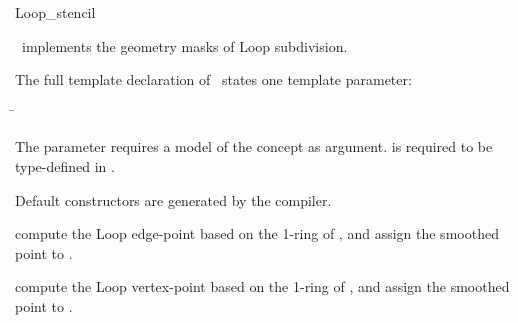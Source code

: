 \begin{ccRefClass}{Loop_stencil}

\ccDefinition

\ccClassTemplateName\ implements the geometry masks of Loop subdivision. 


\ccParameters

The full template declaration of \ccClassTemplateName\ states one
template parameter:

\begin{tabbing}
 \= 
\end{tabbing}
   
The  parameter requires a model of 
the  concept as argument. 
 is required to be type-defined in .

\ccCreation

Default constructors are generated by the compiler.

\ccThree{}{}{}

{compute the Loop edge-point based on the 1-ring of , 
and assign the smoothed point to .}

{compute the Loop vertex-point based on the 1-ring of , 
and assign the smoothed point to .}


\ccSeeAlso

\\
\\

\end{ccRefClass}

\ccRefPageEnd


